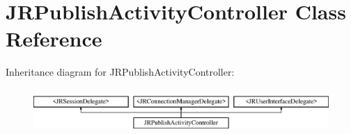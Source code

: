 \hypertarget{interface_j_r_publish_activity_controller}{
\section{JRPublishActivityController Class Reference}
\label{interface_j_r_publish_activity_controller}
}
Inheritance diagram for JRPublishActivityController:\begin{figure}[H]
\begin{center}
\leavevmode
\includegraphics[height=1.744548cm]{interface_j_r_publish_activity_controller}
\end{center}
\end{figure}
